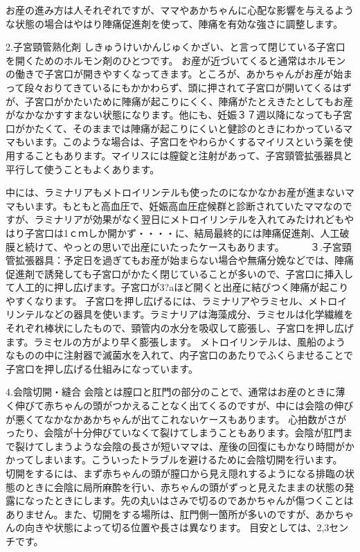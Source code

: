 お産の進み方は人それぞれですが、ママやあかちゃんに心配な影響を与えるような状態の場合はやはり陣痛促進剤を使って、陣痛を有効な強さに調整します。

2.子宮頸管熟化剤
しきゅうけいかんじゅくかざい、と言って閉じている子宮口を開くためのホルモン剤のひとつです。
お産が近づいてくると通常はホルモンの働きで子宮口が開きやすくなってきます。ところが、あかちゃんがお産が始まって段々おりてきているにもかかわらず、頭に押されて子宮口が開いてくるはずが、子宮口がかたいために陣痛が起こりにくく、陣痛がたとえきたとしてもお産がなかなかすすまない状態になります。他にも、妊娠３７週以降になっても子宮口がかたくて、そのままでは陣痛が起こりにくいと健診のときにわかっているママもいます。このような場合は、子宮口をやわらかくするマイリスという薬を使用することもあります。マイリスには膣錠と注射があって、子宮頸管拡張器具と平行して使うこともよくあります。

中には、ラミナリアもメトロイリンテルも使ったのになかなかお産が進まないママもいます。もともと高血圧で、妊娠高血圧症候群と診断されていたママなのですが、ラミナリアが効果がなく翌日にメトロイリンテルを入れてみたけれどもやはり子宮口は1ｃｍしか開かず・・・・に、結局最終的には陣痛促進剤、人工破膜と続けて、やっとの思いで出産にいたったケースもあります。
　　
３.子宮頸管拡張器具：予定日を過ぎてもお産が始まらない場合や無痛分娩などでは、陣痛促進剤で誘発しても子宮口がかたく閉じていることが多いので、子宮口に挿入して人工的に押し広げます。子宮口が3?aほど開くと出産に結びつく陣痛が起こりやすくなります。
子宮口を押し広げるには、ラミナリアやラミセル、メトロイリンテルなどの器具を使います。ラミナリアは海藻成分、ラミセルは化学繊維をそれぞれ棒状にしたもので、頸管内の水分を吸収して膨張し、子宮口を押し広げます。ラミセルの方がより早く膨張します。
メトロイリンテルは、風船のようなものの中に注射器で滅菌水を入れて、内子宮口のあたりでふくらませることで子宮口を押し広げる仕組みになっています。



4.会陰切開・縫合
会陰とは膣口と肛門の部分のことで、通常はお産のときに薄く伸びて赤ちゃんの頭がつかえることなく出てくるのですが、中には会陰の伸びが悪くてなかなかあかちゃんが出てこれないケースもあります。
心拍数がさがったり、会陰が十分伸びていなくて裂けてしまうこともあります。会陰が肛門まで裂けてしまうような会陰の長さが短いママは、産後の回復にもかなり時間がかかってしまいます。こういったトラブルを避けるために会陰切開を行います。
切開をするには、まず赤ちゃんの頭が膣口から見え隠れするようになる排臨の状態のときに会陰に局所麻酔を行い、赤ちゃんの頭がずっと見えたままの状態の発露になったときにします。先の丸いはさみで切るのであかちゃんが傷つくことはありません。また、切開をする場所は、肛門側一箇所が多いのですが、あかちゃんの向きや状態によって切る位置や長さは異なります。
目安としては、2,3センチです。

